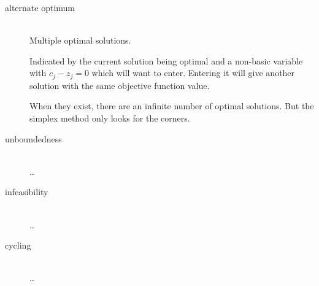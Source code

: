 \documentclass[a4paper, 12pt]{article}
\begin{document}
\begin{description}

\item[alternate optimum] \hfill \\
    Multiple optimal solutions.
    
    Indicated by the current solution being optimal and a non-basic variable
    with $c_j-z_j = 0$ which will want to enter. Entering it will give
    another solution with the same objective function value.
    
    When they exist, there are an infinite number of optimal solutions. But the
    simplex method only looks for the corners.

\item[unboundedness] \hfill \\
    \ldots

\item[infeasibility] \hfill \\
    \ldots

\item[cycling] \hfill \\
    \ldots

\end{description}
\end{document}
